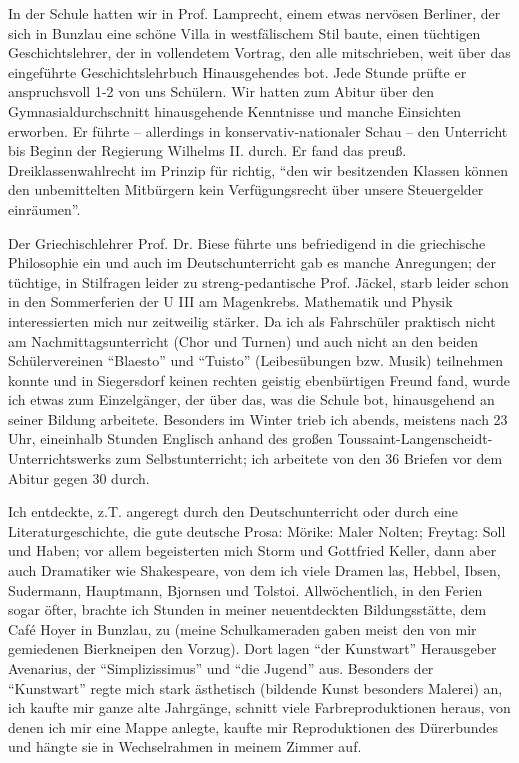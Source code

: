 \documentclass[a5paper,pagesize,10pt,twoside=true]{scrbook}
\begin{document}
In der Schule hatten wir in Prof. Lamprecht, einem etwas nervösen Berliner, der sich in Bunzlau eine schöne Villa in westfälischem Stil baute, einen tüchtigen Geschichtslehrer, der in vollendetem Vortrag, den alle mitschrieben, weit über das eingeführte Geschichtslehrbuch Hinausgehendes bot. Jede Stunde prüfte er anspruchsvoll 1-2 von uns Schülern. Wir hatten zum Abitur über den Gymnasialdurchschnitt hinausgehende Kenntnisse und manche Einsichten erworben. Er führte -- allerdings in konservativ-nationaler Schau -- den Unterricht bis Beginn der Regierung Wilhelms II. durch. Er fand das preuß. Dreiklassenwahlrecht im Prinzip für richtig, \enquote{den wir besitzenden Klassen können den unbemittelten Mitbürgern kein Verfügungsrecht über unsere Steuergelder einräumen}.

Der Griechischlehrer Prof. Dr. Biese führte uns befriedigend in die griechische Philosophie ein und auch im Deutschunterricht gab es manche Anregungen; der tüchtige, in Stilfragen leider zu streng-pedantische Prof. Jäckel, starb leider schon in den Sommerferien der U III am Magenkrebs. Mathematik und Physik interessierten mich nur zeitweilig stärker. Da ich als Fahrschüler praktisch nicht am Nachmittagsunterricht (Chor und Turnen) und auch nicht an den beiden Schülervereinen \enquote{Blaesto} und \enquote{Tuisto} (Leibesübungen bzw. Musik) teilnehmen konnte und in Siegersdorf keinen rechten geistig ebenbürtigen Freund fand, wurde ich etwas zum Einzelgänger, der über das, was die Schule bot, hinausgehend an seiner Bildung arbeitete. Besonders im Winter trieb ich abends, meistens nach 23 Uhr, eineinhalb Stunden Englisch anhand des großen Toussaint-Langenscheidt-Unterrichtswerks zum Selbstunterricht; ich arbeitete von den 36 Briefen vor dem Abitur gegen 30 durch.

Ich entdeckte, z.T. angeregt durch den Deutschunterricht oder durch eine Literaturgeschichte, die gute deutsche Prosa: Mörike: Maler Nolten; Freytag: Soll und Haben; vor allem begeisterten mich Storm und Gottfried Keller, dann aber auch Dramatiker wie Shakespeare, von dem ich viele Dramen las, Hebbel, Ibsen, Sudermann, Hauptmann, Bjornsen und Tolstoi. Allwöchentlich, in den Ferien sogar öfter, brachte ich Stunden in meiner neuentdeckten Bildungsstätte, dem Café Hoyer in Bunzlau, zu (meine Schulkameraden gaben meist den von mir gemiedenen Bierkneipen den Vorzug). Dort lagen \enquote{der Kunstwart} Herausgeber Avenarius, der \enquote{Simplizissimus} und \enquote{die Jugend} aus. Besonders der \enquote{Kunstwart} regte mich stark ästhetisch (bildende Kunst besonders Malerei) an, ich kaufte mir ganze alte Jahrgänge, schnitt viele Farbreproduktionen heraus, von denen ich mir eine Mappe anlegte, kaufte mir Reproduktionen des Dürerbundes und hängte sie in Wechselrahmen in meinem Zimmer auf.
\end{document}

